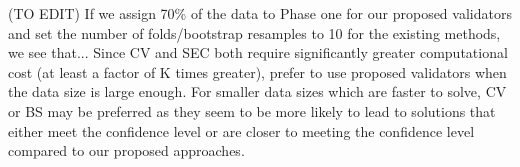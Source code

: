 \documentclass[mnsc,blindrev]{informs4} %
\begin{document}
(TO EDIT) If we assign 70\% of the data to Phase one for our proposed validators and set the number of folds/bootstrap resamples to 10 for the existing methods, we see that... Since CV and SEC both require significantly greater computational cost (at least a factor of K times greater), prefer to use proposed validators when the data size is large enough. For smaller data sizes which are faster to solve, CV or BS may be preferred as they seem to be more likely to lead to solutions that either meet the confidence level or are closer to meeting the confidence level compared to our proposed approaches. 


\end{document}
